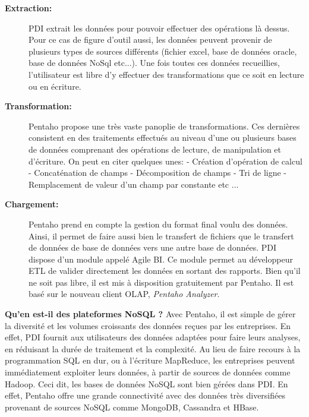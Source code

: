 \documentclass[12pt,a4wide,twoside]{report}
\begin{document}
\begin{description}
	\item[\textbf{Extraction:}]
		PDI extrait les données pour pouvoir effectuer des opérations là dessus. Pour ce cas de figure d'outil aussi, les données peuvent provenir de plusieurs types de sources différents (fichier excel, base de données oracle, base de données NoSql etc...).\newline
		Une fois toutes ces données recueillies, l'utilisateur est libre d'y effectuer des transformations que ce soit en lecture ou en écriture.
	\item[\textbf{Transformation:}]
	Pentaho propose une très vaste panoplie de transformations. Ces dernières consistent en des traitements effectués au niveau d'une ou plusieurs bases de données comprenant des opérations de lecture, de manipulation et d'écriture. \cite{misc1} On peut en citer quelques unes: \newline
	- Création d'opération de calcul\newline
	- Concaténation de champs\newline
	- Décomposition de champs\newline
	- Tri de ligne\newline
	- Remplacement de valeur d'un champ par constante etc ...\newline

	\item[\textbf{Chargement:}]   

	Pentaho prend en compte la gestion du format final voulu des données. Ainsi, il permet de faire aussi bien le transfert de fichiers que le transfert de données de base de données vers une autre base de données.\newline
	PDI dispose d'un module appelé Agile BI. Ce module permet au développeur ETL de valider directement les données en sortant des rapports. Bien qu'il ne soit pas libre, il est mis à disposition gratuitement par Pentaho. Il est basé sur le nouveau client OLAP,  \emph{Pentaho Analyzer}.\newline
	
\end{description}
\textbf{Qu'en est-il des plateformes NoSQL ?} \newline
	Avec Pentaho, il est simple de gérer la diversité et les volumes croissants des données reçues par les entreprises. En effet, PDI fournit aux utilisateurs des données adaptées pour faire leurs analyses, en réduisant la durée de traitement et la complexité. Au lieu de faire recours à la programmation SQL en dur, ou à l’écriture MapReduce, les entreprises peuvent immédiatement exploiter leurs données, à partir de sources de données comme Hadoop. Ceci dit, les bases de données NoSQL sont bien gérées dans PDI. En effet, Pentaho offre une grande connectivité avec des données très diversifiées provenant de sources NoSQL comme MongoDB, Cassandra et HBase.\newline
\end{document}
